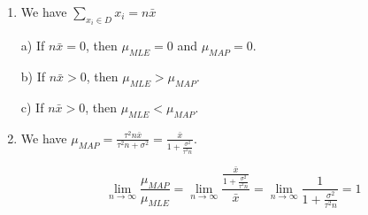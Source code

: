\documentclass[submit]{harvardml}
\begin{document}
\begin{enumerate}
\item

We have $\sum_{x_i\in D} x_i = n\bar{x}$

a) If $n\bar{x} = 0$, then $\mu_{MLE} = 0$ and $\mu_{MAP} = 0$.

b) If $n\bar{x} > 0$, then $\mu_{MLE} > \mu_{MAP}$.

c) If $n\bar{x} > 0$, then $\mu_{MLE} < \mu_{MAP}$.

\item

We have $\mu_{MAP} = \frac{\tau^2n\bar{x}}{\tau^2n + \sigma^2} = \frac{\bar{x}}{1+\frac{\sigma^2}{\tau^2 n}}$.

$$\lim_{n\rightarrow\infty} \frac{\mu_{MAP}}{\mu_{MLE}} = \lim_{n\rightarrow\infty}\frac{ \frac{\bar{x}}{1+\frac{\sigma^2}{\tau^2 n}}}{\bar{x}} =  \lim_{n\rightarrow\infty}\frac{1}{1+\frac{\sigma^2}{\tau^2 n}} = 1$$


\end{enumerate}


\newpage
\end{document}
